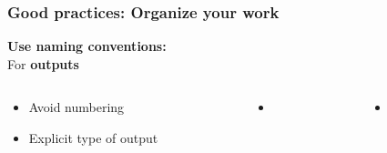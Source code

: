 \documentclass[xcolor=x11names,compress]{beamer}
\renewcommand{\(}{\begin{columns}}
\renewcommand{\)}{\end{columns}}
\newcommand{\<}[1]{\begin{column}{#1}}
\renewcommand{\>}{\end{column}}
\begin{document}
\begin{frame}
\frametitle{\textbf{Good practices:} Organize your work }
\textcolor{siap}{\textbf{Use naming conventions:} \\ }
For \textbf{outputs}
\begin{columns}[t]
 \begin{column}{0.3\textwidth}
    \begin{itemize}[<+->]
   \item Avoid numbering
   \item Explicit type of output
    \end{itemize}
\end{column}
  \begin{column}{0.2\textwidth}
    \begin{itemize}
    \item[]
    \end{itemize}
  \end{column}
  \begin{column}{0.5\textwidth}
    \begin{itemize}
    \item[]
    \end{itemize}
  \end{column}
\end{columns}
\end{frame}
\end{document}

